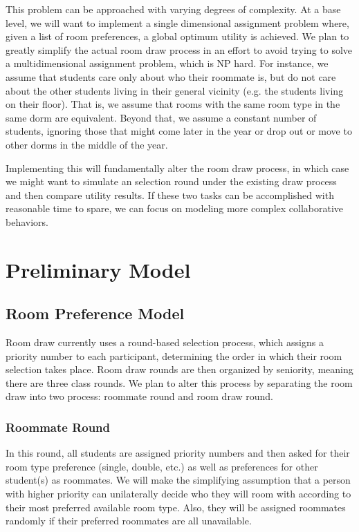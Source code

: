 \documentclass[12pt]{article}
\begin{document}
    This problem can be approached with varying degrees of complexity. At a base level, we will want to implement a single dimensional assignment problem where, given a list of room preferences, a global optimum utility is achieved. We plan to greatly simplify the actual room draw process in an effort to avoid trying to solve a multidimensional assignment problem, which is NP hard. For instance, we assume that students care only about who their roommate is, but do not care about the other students living in their general vicinity (e.g. the students living on their floor). That is, we assume that rooms with the same room type in the same dorm are equivalent. Beyond that, we assume a constant number of students, ignoring those that might come later in the year or drop out or move to other dorms in the middle of the year. 
    
    Implementing this will fundamentally alter the room draw process, in which case we might want to simulate an selection round under the existing draw process and then compare utility results. If these two tasks can be accomplished with reasonable time to spare, we can focus on modeling more complex collaborative behaviors.

    \section*{Preliminary Model}
    \subsection*{Room Preference Model}
    Room draw currently uses a round-based selection process, which assigns a priority number to each participant, determining the order in which their room selection takes place. Room draw rounds are then organized by seniority, meaning there are three class rounds. We plan to alter this process by separating the room draw into two process: roommate round and room draw round.
    \subsubsection*{Roommate Round}
    In this round, all students are assigned priority numbers and then asked for their room type preference (single, double, etc.) as well as preferences for other student(s) as roommates. We will make the simplifying assumption that a person with higher priority can unilaterally decide who they will room with according to their most preferred available room type. Also, they will be assigned roommates randomly if their preferred roommates are all unavailable.
    
\end{document}
